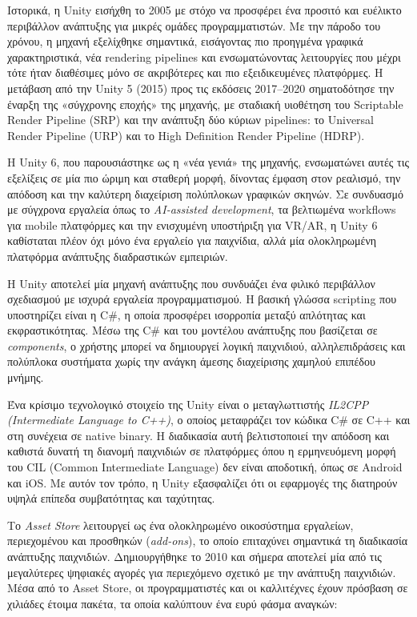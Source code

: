 Ιστορικά, η Unity εισήχθη το 2005 με στόχο να προσφέρει ένα προσιτό και ευέλικτο περιβάλλον ανάπτυξης για μικρές ομάδες προγραμματιστών. Με την πάροδο του χρόνου, η μηχανή εξελίχθηκε σημαντικά, εισάγοντας πιο προηγμένα γραφικά χαρακτηριστικά, νέα rendering pipelines και ενσωματώνοντας λειτουργίες που μέχρι τότε ήταν διαθέσιμες μόνο σε ακριβότερες και πιο εξειδικευμένες πλατφόρμες. Η μετάβαση από την Unity 5 (2015) προς τις εκδόσεις 2017–2020 σηματοδότησε την έναρξη της «σύγχρονης εποχής» της μηχανής, με σταδιακή υιοθέτηση του Scriptable Render Pipeline (SRP) και την ανάπτυξη δύο κύριων pipelines: το Universal Render Pipeline (URP) και το High Definition Render Pipeline (HDRP).

Η Unity 6, που παρουσιάστηκε ως η «νέα γενιά» της μηχανής, ενσωματώνει αυτές τις εξελίξεις σε μία πιο ώριμη και σταθερή μορφή, δίνοντας έμφαση στον ρεαλισμό, την απόδοση και την καλύτερη διαχείριση πολύπλοκων γραφικών σκηνών. Σε συνδυασμό με σύγχρονα εργαλεία όπως το \textit{AI-assisted development}, τα βελτιωμένα workflows για mobile πλατφόρμες και την ενισχυμένη υποστήριξη για VR/AR, η Unity 6 καθίσταται πλέον όχι μόνο ένα εργαλείο για παιχνίδια, αλλά μία ολοκληρωμένη πλατφόρμα ανάπτυξης διαδραστικών εμπειριών.

Η Unity αποτελεί μία μηχανή ανάπτυξης που συνδυάζει ένα φιλικό περιβάλλον σχεδιασμού με ισχυρά εργαλεία προγραμματισμού. Η βασική γλώσσα scripting που υποστηρίζει είναι η C\#, η οποία προσφέρει ισορροπία μεταξύ απλότητας και εκφραστικότητας. Μέσω της C\# και του μοντέλου ανάπτυξης που βασίζεται σε \textit{components}, ο χρήστης μπορεί να δημιουργεί λογική παιχνιδιού, αλληλεπιδράσεις και πολύπλοκα συστήματα χωρίς την ανάγκη άμεσης διαχείρισης χαμηλού επιπέδου μνήμης.

Ένα κρίσιμο τεχνολογικό στοιχείο της Unity είναι ο μεταγλωττιστής \textit{IL2CPP (Intermediate Language to C++)}, ο οποίος μεταφράζει τον κώδικα C\# σε C++ και στη συνέχεια σε native binary. Η διαδικασία αυτή βελτιστοποιεί την απόδοση και καθιστά δυνατή τη διανομή παιχνιδιών σε πλατφόρμες όπου η ερμηνευόμενη μορφή του CIL (Common Intermediate Language) δεν είναι αποδοτική, όπως σε Android και iOS. Με αυτόν τον τρόπο, η Unity εξασφαλίζει ότι οι εφαρμογές της διατηρούν υψηλά επίπεδα συμβατότητας και ταχύτητας.

Tο \textit{Asset Store} λειτουργεί ως ένα ολοκληρωμένο οικοσύστημα εργαλείων, περιεχομένου και προσθηκών (\textit{add-ons}), το οποίο επιταχύνει σημαντικά τη διαδικασία ανάπτυξης παιχνιδιών. Δημιουργήθηκε το 2010 και σήμερα αποτελεί μία από τις μεγαλύτερες ψηφιακές αγορές για περιεχόμενο σχετικό με την ανάπτυξη παιχνιδιών. Μέσα από το Asset Store, οι προγραμματιστές και οι καλλιτέχνες έχουν πρόσβαση σε χιλιάδες έτοιμα πακέτα, τα οποία καλύπτουν ένα ευρύ φάσμα αναγκών: 

